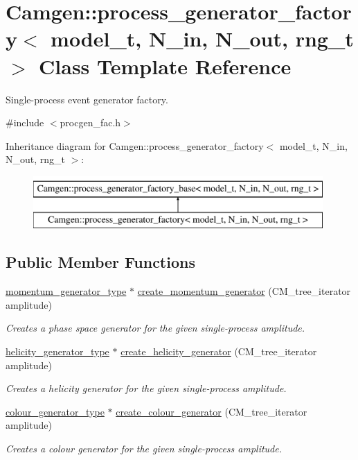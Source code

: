 \hypertarget{a00437}{}\section{Camgen\+:\+:process\+\_\+generator\+\_\+factory$<$ model\+\_\+t, N\+\_\+in, N\+\_\+out, rng\+\_\+t $>$ Class Template Reference}
\label{a00437}


Single-\/process event generator factory.  




{\ttfamily \#include $<$procgen\+\_\+fac.\+h$>$}

Inheritance diagram for Camgen\+:\+:process\+\_\+generator\+\_\+factory$<$ model\+\_\+t, N\+\_\+in, N\+\_\+out, rng\+\_\+t $>$\+:\begin{figure}[H]
\begin{center}
\leavevmode
\includegraphics[height=2.000000cm]{a00437}
\end{center}
\end{figure}
\subsection*{Public Member Functions}
\begin{DoxyCompactItemize}
\item 
\hypertarget{a00437_a0e6b37f75d6f845c299785d7ef6b3973}{}\hyperlink{a00450}{momentum\+\_\+generator\+\_\+type} $\ast$ \hyperlink{a00437_a0e6b37f75d6f845c299785d7ef6b3973}{create\+\_\+momentum\+\_\+generator} (C\+M\+\_\+tree\+\_\+iterator amplitude)\label{a00437_a0e6b37f75d6f845c299785d7ef6b3973}

\begin{DoxyCompactList}\small\item\em Creates a phase space generator for the given single-\/process amplitude. \end{DoxyCompactList}\item 
\hyperlink{a00270}{helicity\+\_\+generator\+\_\+type} $\ast$ \hyperlink{a00437_af0a9ded4f275a0ea494fd80fbe14748a}{create\+\_\+helicity\+\_\+generator} (C\+M\+\_\+tree\+\_\+iterator amplitude)
\begin{DoxyCompactList}\small\item\em Creates a helicity generator for the given single-\/process amplitude. \end{DoxyCompactList}\item 
\hyperlink{a00077}{colour\+\_\+generator\+\_\+type} $\ast$ \hyperlink{a00437_a7b7c8f57a0cbe927041497ed57c6415b}{create\+\_\+colour\+\_\+generator} (C\+M\+\_\+tree\+\_\+iterator amplitude)
\begin{DoxyCompactList}\small\item\em Creates a colour generator for the given single-\/process amplitude. \end{DoxyCompactList}\end{DoxyCompactItemize}
